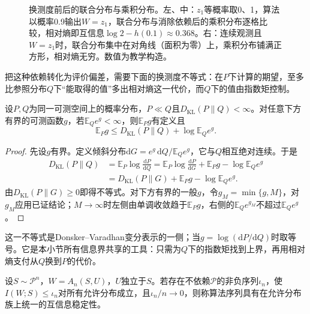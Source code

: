 \begin{figure}[htbp]
 \centering
 
 \caption{换测度前后的联合分布与乘积分布。左、中：$z_1$等概率取0、1，算法以概率0.9输出$W=z_1$，联合分布与消除依赖后的乘积分布逐格比较，相对熵即互信息$\log2-h(0.1)\approx0.368$。右：连续观测且$W=z_1$时，联合分布集中在对角线（面积为零）上，乘积分布铺满正方形，相对熵无穷。数值为教学构造。}
 \label{fig:lt7a-joint-product-information}
\end{figure}

把这种依赖转化为评价偏差，需要下面的换测度不等式：在$P$下计算的期望，至多比参照分布$Q$下“能取得的值”多出相对熵这一代价，而$Q$下的值由指数矩控制。

\begin{lemma}[换测度不等式]
\label{lem:change-of-measure}
设$P,Q$为同一可测空间上的概率分布，$P\ll Q$且$D_{\mathrm{KL}}(P\|Q)<\infty$。对任意下方有界的可测函数$g$，若$\mathbb E_Qe^g<\infty$，则$\mathbb E_Pg$有定义且
\begin{equation}
 \mathbb E_Pg\leq D_{\mathrm{KL}}(P\|Q)+\log\mathbb E_Qe^g.
 \label{eq:change-of-measure-general}
\end{equation}
\end{lemma}
\begin{proof}
先设$g$有界。定义倾斜分布$\mathrm dG=e^g\,\mathrm dQ/\mathbb E_Qe^g$，它与$Q$相互绝对连续。于是
\[
\begin{aligned}
 D_{\mathrm{KL}}(P\|Q)&=\mathbb E_P\log\frac{\mathrm dP}{\mathrm dQ}
 =\mathbb E_P\log\frac{\mathrm dP}{\mathrm dG}+\mathbb E_Pg-\log\mathbb E_Qe^g\\
 &=D_{\mathrm{KL}}(P\|G)+\mathbb E_Pg-\log\mathbb E_Qe^g.
\end{aligned}
\]
由$D_{\mathrm{KL}}(P\|G)\geq0$即得不等式。对下方有界的一般$g$，令$g_M=\min\{g,M\}$，对$g_M$应用已证结论；$M\to\infty$时左侧由单调收敛趋于$\mathbb E_Pg$，右侧的$\mathbb E_Qe^{g_M}$不超过$\mathbb E_Qe^g$。
\end{proof}

这一不等式是Donsker--Varadhan变分表示的一侧；当$g=\log(\mathrm dP/\mathrm dQ)$时取等号。它是本小节所有信息界共享的工具：只需为$Q$下的指数矩找到上界，再用相对熵支付从$Q$换到$P$的代价。

\begin{definition}[互信息稳定性]
\label{def:mutual-information-stability}
设$S\sim\mathcal P^n$，$W=A_n(S,U)$，$U$独立于$S$。若存在不依赖$\mathcal P$的非负序列$\iota_n$，使$I(W;S)\leq\iota_n$对所有允许分布成立，且$\iota_n/n\to0$，则称算法序列具有在允许分布族上统一的互信息稳定性。
\end{definition}

